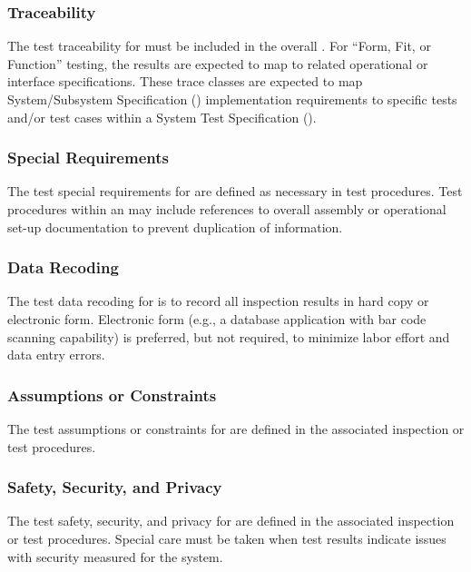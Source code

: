 \subsubsection{Traceability}
\label{loc:TestTraceability\TestIdName}

The test traceability for \TestIdNameX must be included in the overall \RTVM.
For ``Form, Fit, or Function'' testing, the results are expected to map to related operational or interface specifications.
These trace classes are expected to map System/Subsystem Specification (\SSS) implementation requirements to specific tests and/or test cases within a System Test Specification (\STS).

\subsubsection{Special Requirements}
\label{loc:TestSpecialRequirements\TestIdName}

The test special requirements for \TestIdNameX are defined as necessary in test procedures.
Test procedures within an \STS may include references to overall assembly or operational set-up documentation to prevent duplication of information.

\subsubsection{Data Recoding}
\label{loc:TestDataRecoding\TestIdName}

The test data recoding for \TestIdNameX is to record all inspection results in hard copy or electronic form.
Electronic form (e.g., a database application with bar code scanning capability) is preferred, but not required, to minimize labor effort and data entry errors.

\subsubsection{Assumptions or Constraints}
\label{loc:TestAssumptionsOrConstraints\TestIdName}

The test assumptions or constraints for \TestIdNameX are defined in the associated inspection or test procedures.

\subsubsection{Safety, Security, and Privacy}
\label{loc:TestSafetySecurityPrivacy\TestIdName}

The test safety, security, and privacy for \TestIdNameX are defined in the associated inspection or test procedures.
Special care must be taken when test results indicate issues with security measured for the system.

